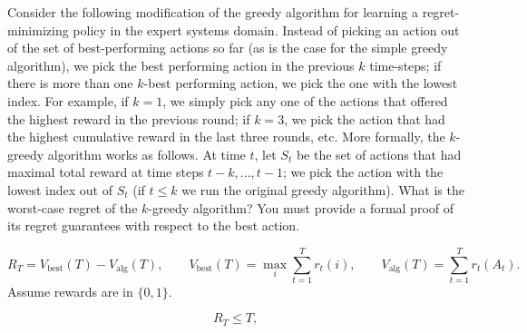 \documentclass[10pt,a4paper,answers]{exam}
\begin{document}
{\begin{questions}


\question[10] Consider the following modification of the greedy algorithm for learning a regret-minimizing policy in the expert systems domain.
Instead of picking an action out of the set of best-performing actions so far (as is the case for the simple greedy algorithm), we pick the best performing action in the previous $k$ time-steps; if there is more than one $k$-best performing action, we pick the one with the lowest index. For example, if $k = 1$, we simply pick any one of the actions that offered the highest reward in the previous round; if $k = 3$, we pick the action that had the highest cumulative reward in the last three rounds, etc.
More formally, the $k$-greedy algorithm works as follows. At time $t$, let $S_t$ be the set of actions that had maximal total reward at time steps $t - k, . . . , t - 1$; we pick the action with the lowest index out of $S_t$ (if $t \le k$ we run the original greedy algorithm).
What is the worst-case regret of the $k$-greedy algorithm? You must provide a formal proof of its regret guarantees with respect to the best action.
\begin{solution}
\[
R_T = V_{\mathrm{best}}(T)-V_{\mathrm{alg}}(T),
\qquad V_{\mathrm{best}}(T)=\max_i \sum_{t=1}^T r_t(i),
\qquad
V_{\mathrm{alg}}(T)=\sum_{t=1}^T r_t(A_t).
\]
Assume rewards are in \(\{0,1\}\).

\[
R_T \le T,
\]


\end{solution}
\end{questions}}
\end{document}
